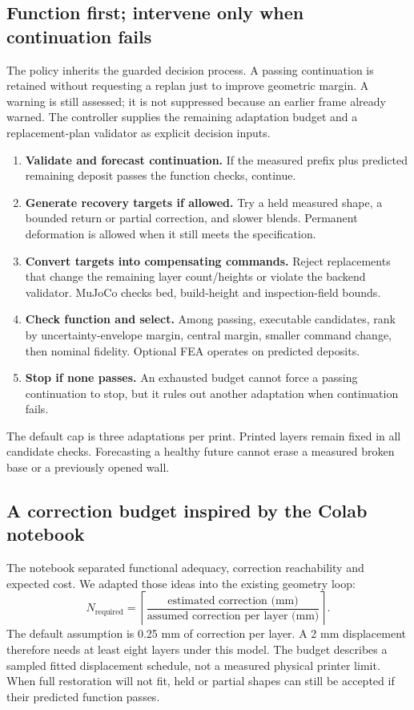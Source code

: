 \documentclass[10pt,letterpaper]{article}
\newcommand{\code}[1]{\texttt{\detokenize{#1}}}
\begin{document}
\subsection*{Function first; intervene only when continuation fails}
The \code{contour} policy inherits the guarded decision process. A passing
continuation is retained without requesting a replan just to improve geometric
margin. A warning is still assessed; it is not suppressed because an earlier
frame already warned. The controller supplies the remaining adaptation budget
and a replacement-plan validator as explicit decision inputs.

\begin{enumerate}
\item \textbf{Validate and forecast continuation.} If the measured prefix plus
predicted remaining deposit passes the function checks, continue.
\item \textbf{Generate recovery targets if allowed.} Try a held measured shape,
a bounded return or partial correction, and slower blends. Permanent deformation
is allowed when it still meets the specification.
\item \textbf{Convert targets into compensating commands.} Reject replacements
that change the remaining layer count/heights or violate the backend validator.
MuJoCo checks bed, build-height and inspection-field bounds.
\item \textbf{Check function and select.} Among passing, executable candidates,
rank by uncertainty-envelope margin, central margin, smaller command change,
then nominal fidelity. Optional FEA operates on predicted deposits.
\item \textbf{Stop if none passes.} An exhausted budget cannot force a passing
continuation to stop, but it rules out another adaptation when continuation fails.
\end{enumerate}

The default cap is three adaptations per print. Printed layers remain fixed in
all candidate checks. Forecasting a healthy future cannot erase a measured
broken base or a previously opened wall.

\subsection*{A correction budget inspired by the Colab notebook}
The notebook separated functional adequacy, correction reachability and expected
cost. We adapted those ideas into the existing geometry loop:
\[
N_{\mathrm{required}}=\left\lceil
\frac{\text{estimated correction (mm)}}{\text{assumed correction per layer (mm)}}
\right\rceil.
\]
The default assumption is 0.25 mm of correction per layer. A 2 mm displacement
therefore needs at least eight layers under this model. The budget describes a
sampled fitted displacement schedule, not a measured physical printer limit.
When full restoration will not fit, held or partial shapes can still be accepted
if their predicted function passes.
\end{document}
